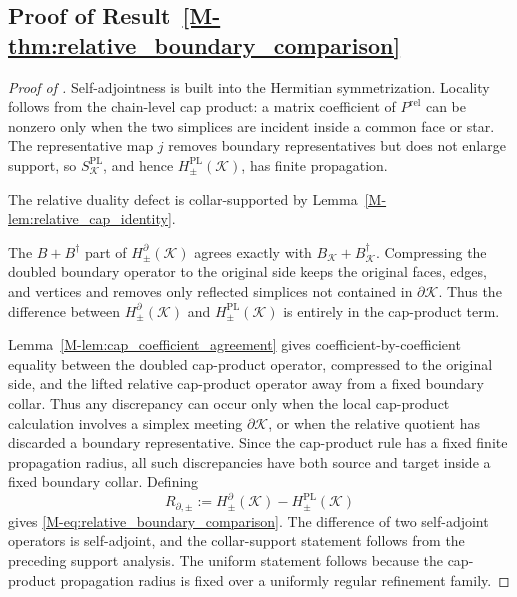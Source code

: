 \documentclass[11pt]{article}
\numberwithin{equation}{section}
\theoremstyle{definition}
\theoremstyle{remark}
\newcommand{\K}{\mathcal{K}}
\newcommand{\bd}{\partial}
\begin{document}
\subsection{Proof of Result~\ref{M-thm:relative_boundary_comparison}}\label{app:proof:thm:relative_boundary_comparison}
\begin{proof}[Proof of ]
Self-adjointness is built into the Hermitian symmetrization. Locality follows from the chain-level
cap product: a matrix coefficient of \(P^{\mathrm{rel}}\) can be nonzero only when the two
simplices are incident inside a common face or star. The representative map \(j\) removes boundary
representatives but does not enlarge support, so \(S^{\mathrm{PL}}_\K\), and hence
\(H^{\mathrm{PL}}_{\pm}(\K)\), has finite propagation.

The relative duality defect is collar-supported by Lemma~\ref{M-lem:relative_cap_identity}.

The \(B+B^\dagger\) part of \(H_{\pm}^{\bd}(\K)\) agrees exactly with \(B_\K+B_\K^\dagger\).
Compressing the doubled boundary operator to the original side keeps the original faces, edges,
and vertices and removes only reflected simplices not contained in \(\bd\K\). Thus the difference
between \(H_{\pm}^{\bd}(\K)\) and \(H^{\mathrm{PL}}_{\pm}(\K)\) is entirely in the cap-product
term.

Lemma~\ref{M-lem:cap_coefficient_agreement} gives coefficient-by-coefficient equality between the
doubled cap-product operator, compressed to the original side, and the lifted relative cap-product
operator away from a fixed boundary collar. Thus any discrepancy can occur only when the local
cap-product calculation involves a simplex meeting \(\bd\K\), or when the relative quotient has
discarded a boundary representative. Since the cap-product rule has a fixed finite propagation
radius, all such discrepancies have both source and target inside a fixed boundary collar. Defining
\[
R_{\partial,\pm}:=
H_{\pm}^{\bd}(\K)-H^{\mathrm{PL}}_{\pm}(\K)
\]
gives \eqref{M-eq:relative_boundary_comparison}. The difference of two self-adjoint operators is
self-adjoint, and the collar-support statement follows from the preceding support analysis. The
uniform statement follows because the cap-product propagation radius is fixed over a uniformly
regular refinement family.
\end{proof}
\end{document}
